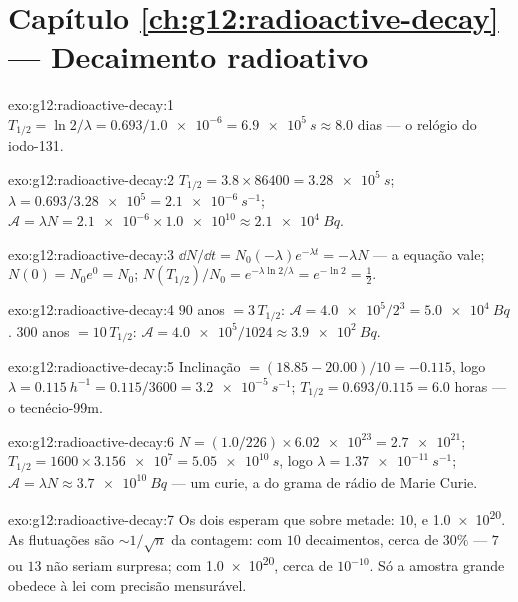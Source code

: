 \section*{Capítulo \ref{ch:g12:radioactive-decay} --- Decaimento radioativo}

\begin{solution}{exo:g12:radioactive-decay:1}
$T_{1/2} = \ln 2/\lambda = 0.693/\num{1.0e-6} = \qty{6.9e5}{s} \approx
8.0$ dias --- o relógio do iodo-131.
\end{solution}

\begin{solution}{exo:g12:radioactive-decay:2}
$T_{1/2} = 3.8 \times \num{86400} = \qty{3.28e5}{s}$;
$\lambda = 0.693/\num{3.28e5} = \qty{2.1e-6}{s^{-1}}$;
$\mathcal A = \lambda N = \num{2.1e-6} \times \num{1.0e10} \approx
\qty{2.1e4}{Bq}$.
\end{solution}

\begin{solution}{exo:g12:radioactive-decay:3}
$\dd N/\dd t = N_0(-\lambda)e^{-\lambda t} = -\lambda N$ --- a equação
vale; $N(0) = N_0 e^0 = N_0$;
$N(T_{1/2})/N_0 = e^{-\lambda \ln 2/\lambda} = e^{-\ln 2} = \tfrac12$.
\end{solution}

\begin{solution}{exo:g12:radioactive-decay:4}
$90$ anos $= 3\,T_{1/2}$: $\mathcal A = \num{4.0e5}/2^3 =
\qty{5.0e4}{Bq}$. $300$ anos $= 10\,T_{1/2}$:
$\mathcal A = \num{4.0e5}/1024 \approx \qty{3.9e2}{Bq}$.
\end{solution}

\begin{solution}{exo:g12:radioactive-decay:5}
Inclinação $= (18.85 - 20.00)/10 = -0.115$, logo
$\lambda = \qty{0.115}{h^{-1}} = 0.115/3600 = \qty{3.2e-5}{s^{-1}}$;
$T_{1/2} = 0.693/0.115 = 6.0$ horas --- o tecnécio-99m.
\end{solution}

\begin{solution}{exo:g12:radioactive-decay:6}
$N = (1.0/226) \times \num{6.02e23} = \num{2.7e21}$;
$T_{1/2} = 1600 \times \num{3.156e7} = \qty{5.05e10}{s}$, logo
$\lambda = \qty{1.37e-11}{s^{-1}}$;
$\mathcal A = \lambda N \approx \qty{3.7e10}{Bq}$ --- um curie, a
 do grama de rádio de Marie Curie.
\end{solution}

\begin{solution}{exo:g12:radioactive-decay:7}
Os dois esperam que sobre metade: $10$, e \num{1.0e20}. As flutuações são
$\sim 1/\sqrt{n}$ da contagem: com $10$ decaimentos, cerca de $30\%$ ---
$7$ ou $13$ não seriam surpresa; com \num{1.0e20}, cerca de $10^{-10}$.
Só a amostra grande obedece à lei com precisão mensurável.
\end{solution}

